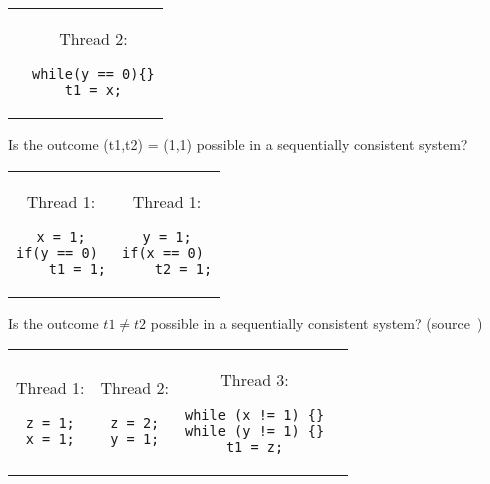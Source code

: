 \begin{ExerciseList}
\begin{tabular}{cc}
&

\begin{minipage}{0.5\textwidth}
Thread 2:
\begin{Verbatim}
while(y == 0){}
t1 = x;
\end{Verbatim}
\end{minipage}
\end{tabular}


\Exercise
Is the outcome (t1,t2) = (1,1) possible in a sequentially consistent system? \\

\begin{tabular}{cc}

\begin{minipage}{0.5\textwidth}
Thread 1:
\begin{Verbatim}
x = 1;
if(y == 0) 
	t1 = 1;
\end{Verbatim}
\end{minipage}
&

\begin{minipage}{0.5\textwidth}
Thread 1:
\begin{Verbatim}
y = 1;
if(x == 0) 
	t2 = 1;
\end{Verbatim}
\end{minipage}
\end{tabular}

\Exercise

Is the outcome $t1 \ne t2$ possible in a sequentially consistent system? (source~\cite{shared-mem-tut})\\

\begin{tabular}{cccc}

\begin{minipage}{0.25\textwidth}
Thread 1:
\begin{Verbatim}
z = 1;
x = 1;
\end{Verbatim}
\end{minipage}

&

\begin{minipage}{0.25\textwidth}
Thread 2:
\begin{Verbatim}
z = 2;
y = 1;
\end{Verbatim}
\end{minipage}

& 

\begin{minipage}{0.25\textwidth}
Thread 3:
\begin{Verbatim}
while (x != 1) {}
while (y != 1) {}
t1 = z;
\end{Verbatim}
\end{minipage}
&


\end{tabular}
\end{ExerciseList}

